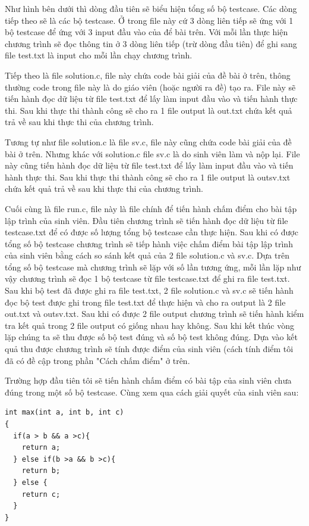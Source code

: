 \documentclass[12pt,a4paper]{article}
\begin{document}
Như hình bên dưới thì dòng đầu tiên sẽ biểu hiện tổng số bộ testcase. Các dòng tiếp theo sẽ là các bộ testcase. Ở trong file này cứ 3 dòng liên tiếp sẽ ứng với 1 bộ testcase để ứng với 3 input đầu vào của để bài trên. Với mỗi lần thực hiện chương trình sẽ đọc thông tin ở 3 dòng liên tiếp (trừ dòng đầu tiên) để ghi sang file test.txt là input cho mỗi lần chạy chương trình.

Tiếp theo là file solution.c, file này chứa code bài giải của đề bài ở trên, thông thường code trong file này là do giáo viên (hoặc người ra đề) tạo ra. File này sẽ tiến hành đọc dữ liệu từ file test.txt để lấy làm input đầu vào và tiến hành thực thi. Sau khi thực thi thành công sẽ cho ra 1 file output là out.txt chứa kết quả trả về sau khi thực thi của chương trình.

Tương tự như file solution.c là file sv.c, file này cũng chứa code bài giải của đề bài ở trên. Nhưng khác với solution.c file sv.c là do sinh viên làm và nộp lại. File này cũng tiến hành đọc dữ liệu từ file test.txt để lấy làm input đầu vào và tiến hành thực thi. Sau khi thực thi thành công sẽ cho ra 1 file output là outsv.txt chứa kết quả trả về sau khi thực thi của chương trình.

Cuối cùng là file run.c, file này là file chính để tiến hành chấm điểm cho bài tập lập trình của sinh viên. Đầu tiên chương trình sẽ tiến hành đọc dữ liệu từ file testcase.txt để có được số lượng tổng bộ testcase cần thực hiện. Sau khi có được tổng số bộ testcase chương trình sẽ tiếp hành việc chấm điểm bài tập lập trình của sinh viên bằng cách so sánh kết quả của 2 file solution.c và sv.c. Dựa trên tổng số bộ testcase mà chương trình sẽ lặp với số lần tương ứng, mỗi lần lặp như vậy chương trình sẽ đọc 1 bộ testcase từ file testcase.txt để ghi ra file test.txt. Sau khi bộ test đã được ghi ra file test.txt, 2 file solution.c và sv.c sẽ tiến hành đọc bộ test được ghi trong file test.txt để thực hiện và cho ra output là 2 file out.txt và outsv.txt. Sau khi có được 2 file output chương trình sẽ tiến hành kiểm tra kết quả trong 2 file output có giống nhau hay không. Sau khi kết thúc vòng lặp chúng ta sẽ thu được số bộ test đúng và số bộ test không đúng. Dựa vào kết quả thu được chương trình sẽ tính được điểm của sinh viên (cách tính điểm tôi đã có đề cập trong phần "Cách chấm điểm" ở trên.

Trường hợp đầu tiên tôi sẽ tiến hành chấm điểm có bài tập của sinh viên chưa đúng trong một số bộ testcase. Cùng xem qua cách giải quyết của sinh viên sau:

\begin{lstlisting}
int max(int a, int b, int c)
{
  if(a > b && a >c){   
    return a;
  } else if(b >a && b >c){
    return b;
  } else {
    return c;
  }
}
\end{lstlisting}
\end{document}
